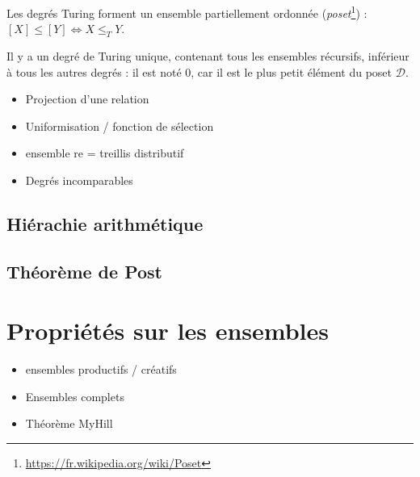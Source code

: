 \documentclass{book}
\theoremstyle{definition}
\numberwithin{lemma}{subsection}
\numberwithin{theorem}{subsection}
\numberwithin{definition}{subsection}
\numberwithin{proposition}{subsection}
\numberwithin{corollary}{subsection}
\numberwithin{property}{subsection}
\numberwithin{example}{subsection}
\numberwithin{heuristique}{subsection}
\numberwithin{scenario}{subsection}
\begin{document}
                Les degrés Turing forment un ensemble partiellement ordonnée (\textit{poset}\footnote{\url{https://fr.wikipedia.org/wiki/Poset}}) : $[X] \leq [Y] \Leftrightarrow X \leq_T Y$.
                \par Il y a un degré de Turing unique, contenant tous les ensembles récursifs, inférieur à tous les autres degrés : il est noté 0, car il est le plus petit élément du poset $\mathcal{D}$.
                
            \begin{itemize}
                \item Projection d'une relation
                \item Uniformisation / fonction de sélection
                \item ensemble re = treillis distributif
                \item Degrés incomparables
            \end{itemize}
                
        \subsection{Hiérachie arithmétique}
        \subsection{Théorème de Post}
    
    \section{Propriétés sur les ensembles}
        \begin{itemize}
            \item ensembles productifs / créatifs
            \item Ensembles complets
            \item Théorème MyHill
        \end{itemize}
\end{document}
